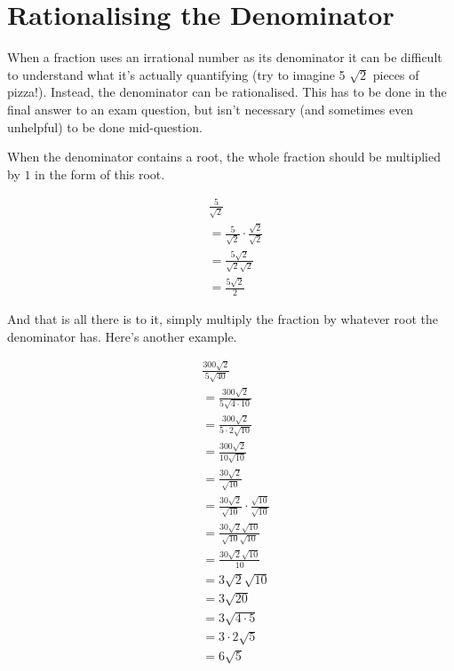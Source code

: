 \section{Rationalising the Denominator}
When a fraction uses an irrational number as its denominator it can be difficult to understand what it's actually quantifying (try to imagine 5 $\sqrt{2}$ pieces of pizza!). Instead, the denominator can be rationalised. This has to be done in the final answer to an exam question, but isn't necessary (and sometimes even unhelpful) to be done mid-question.

When the denominator contains a root, the whole fraction should be multiplied by $1$ in the form of this root.

\begin{align*}
	&\frac{5}{\sqrt{2}}\\
	&=\frac{5}{\sqrt{2}} \cdot \frac{\sqrt{2}}{\sqrt{2}}\\
	&=\frac{5\sqrt{2}}{\sqrt{2}\sqrt{2}}\\
	&=\frac{5\sqrt{2}}{2}
\end{align*}

And that is all there is to it, simply multiply the fraction by whatever root the denominator has. Here's another example.

\begin{align*}
	&\frac{300\sqrt{2}}{5\sqrt{40}}\\[5pt]
	&=\frac{300\sqrt{2}}{5\sqrt{4 \cdot 10}}\\[5pt]
	&=\frac{300\sqrt{2}}{5 \cdot 2\sqrt{10}}\\[5pt]
	&=\frac{300\sqrt{2}}{10\sqrt{10}}\\[5pt]
	&=\frac{30\sqrt{2}}{\sqrt{10}}\\[5pt]
	&=\frac{30\sqrt{2}}{\sqrt{10}} \cdot \frac{\sqrt{10}}{\sqrt{10}}\\[5pt]
	&=\frac{30\sqrt{2}\sqrt{10}}{\sqrt{10}\sqrt{10}}\\[5pt]
	&=\frac{30\sqrt{2}\sqrt{10}}{10}\\[5pt]
	&=3\sqrt{2}\sqrt{10}\\
	&=3\sqrt{20}\\
	&=3\sqrt{4 \cdot 5}\\
	&=3 \cdot 2 \sqrt{5}\\
	&=6\sqrt{5}
\end{align*}